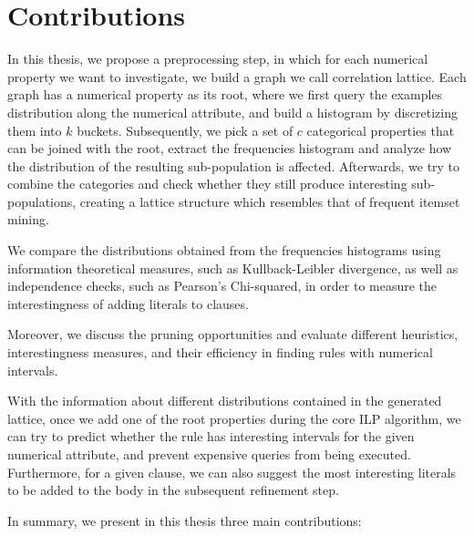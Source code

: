 \section{Contributions}
In this thesis, we propose a preprocessing step, in which for each numerical property we want to investigate,
we build a graph we call correlation lattice. Each graph has a numerical property as its root, where we first
query the examples distribution along the numerical attribute, and build a histogram by discretizing them into $k$
buckets. Subsequently, we  pick a set of $c$ categorical properties that can be joined with the root, extract the
frequencies histogram and analyze how the distribution of the resulting sub-population is affected. Afterwards, we try
to combine the categories and check whether they still produce interesting sub-populations, creating a lattice
structure which resembles that of frequent itemset mining.

We compare the distributions obtained from the frequencies histograms using information theoretical measures,
such as Kullback-Leibler divergence, as well as independence checks, such as Pearson's Chi-squared, in order to
measure the interestingness of adding literals to clauses.

Moreover, we discuss the pruning opportunities and evaluate different heuristics, interestingness measures, and
their efficiency in finding rules with numerical intervals. 

\begin{comment}
In a clause containing a numerical attribute in the body, we can obtain a support and confidence as well as support
value for each of the buckets. Therewith, we can search the most interesting intervals that satisfies the support and
confidence thresholds
\end{comment}

With the information about different distributions contained in the generated lattice, once we add one of the
root properties during the core ILP algorithm, we can try to predict whether the rule has interesting intervals for the
given numerical attribute, and prevent expensive queries from being executed. Furthermore, for a given clause, we
can also suggest the most interesting literals to be added to the body in the subsequent refinement step.

In summary, we present in this thesis three main contributions:

